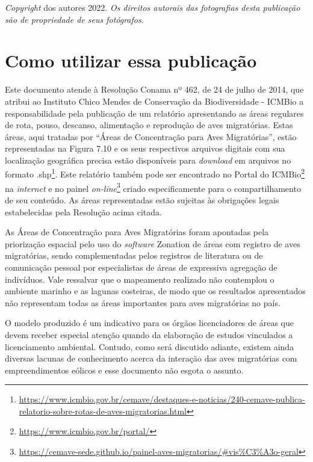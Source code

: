 \documentclass[
  oneside]{scrbook}
\DeclareRobustCommand{\href}[2]{#2\footnote{\url{#1}}}
\begin{document}
\emph{Copyright} dos autores 2022. \emph{Os direitos autorais das fotografias desta publicação são de propriedade de seus fotógrafos.}

\hypertarget{como-utilizar}{%
\chapter*{Como utilizar essa publicação}\label{como-utilizar}}

Este documento atende à Resolução Conama nº 462, de 24 de julho de 2014, que atribui ao Instituto Chico Mendes de Conservação da Biodiversidade - ICMBio a responsabilidade pela publicação de um relatório apresentando as áreas regulares de rota, pouso, descanso, alimentação e reprodução de aves migratórias. Estas áreas, aqui tratadas por ``Áreas de Concentração para Aves Migratórias'', estão representadas na Figura 7.10 e os seus respectivos arquivos digitais com sua localização geográfica precisa estão disponíveis para \emph{download} em \href{https://www.icmbio.gov.br/cemave/destaques-e-noticias/240-cemave-publica-relatorio-sobre-rotas-de-aves-migratorias.html}{arquivos no formato .shp}. Este relatório também pode ser encontrado no \href{https://www.icmbio.gov.br/portal/}{Portal do ICMBio} na \emph{internet} e no \href{https://cemave-sede.github.io/painel-aves-migratorias/\#vis\%C3\%A3o-geral}{painel \emph{on-line}} criado especificamente para o compartilhamento de seu conteúdo. As áreas representadas estão sujeitas às obrigações legais estabelecidas pela Resolução acima citada.

As Áreas de Concentração para Aves Migratórias foram apontadas pela priorização espacial pelo uso do \emph{software} Zonation de áreas com registro de aves migratórias, sendo complementadas pelos registros de literatura ou de comunicação pessoal por especialistas de áreas de expressiva agregação de indivíduos. Vale ressalvar que o mapeamento realizado não contemplou o ambiente marinho e as lagunas costeiras, de modo que os resultados apresentados não representam todas as áreas importantes para aves migratórias no país.

O modelo produzido é um indicativo para os órgãos licenciadores de áreas que devem receber especial atenção quando da elaboração de estudos vinculados a licenciamento ambiental. Contudo, como será discutido adiante, existem ainda diversas lacunas de conhecimento acerca da interação das aves migratórias com empreendimentos eólicos e esse documento não esgota o assunto.
\end{document}

